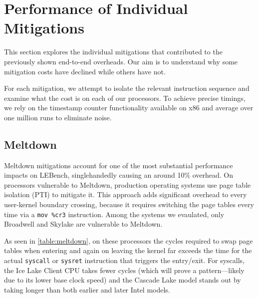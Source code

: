 \section{Performance of Individual Mitigations}
\label{s:evolution-eval}

This section explores the individual mitigations that contributed
to the previously shown end-to-end overheads.
Our aim is to understand why some mitigation costs have declined while others have not.

For each mitigation, we attempt to isolate the relevant instruction sequence and examine what the cost is on each of our processors.
To achieve precise timings, we rely on the timestamp counter functionality available on x86 and average over one million runs to eliminate noise.

\subsection{Meltdown}

Meltdown mitigations account for one of the most substantial performance impacts on LEBench, singlehandedly causing an around 10\% overhead.
On processors vulnerable to Meltdown, production operating systems use page table isolation (PTI) to mitigate it.
This approach adds significant overhead to every user-kernel boundary crossing, because it requires switching the page tables every time via a \texttt{mov \%cr3} instruction.
Among the systems we evaulated, only Broadwell and Skylake are vulnerable to Meltdown.

As seen in \autoref{table:meltdown}, on these processors the cycles required to swap page tables when entering and again on leaving the kernel far exceeds the time for the actual \texttt{syscall} or \texttt{sysret} instruction that triggers the entry/exit.
For syscalls, the Ice Lake Client CPU takes fewer cycles (which will prove a pattern---likely due to its lower base clock speed) and the Cascade Lake model stands out by taking longer than both earlier and later Intel models.

